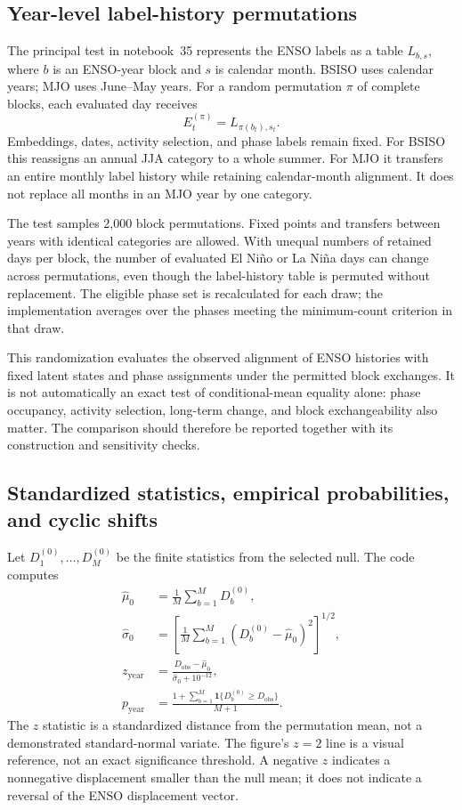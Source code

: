 \documentclass[11pt]{article}
\begin{document}
\subsection{Year-level label-history permutations}

The principal test in notebook~35 represents the ENSO labels as a table $L_{b,s}$, where $b$ is an ENSO-year block and $s$ is calendar month. BSISO uses calendar years; MJO uses June--May years. For a random permutation $\pi$ of complete blocks, each evaluated day receives
\begin{equation}
E_t^{(\pi)}=L_{\pi(b_t),s_t}.
\label{eq:permutation}
\end{equation}
Embeddings, dates, activity selection, and phase labels remain fixed. For BSISO this reassigns an annual JJA category to a whole summer. For MJO it transfers an entire monthly label history while retaining calendar-month alignment. It does not replace all months in an MJO year by one category.

The test samples 2,000 block permutations. Fixed points and transfers between years with identical categories are allowed. With unequal numbers of retained days per block, the number of evaluated El Ni\~no or La Ni\~na days can change across permutations, even though the label-history table is permuted without replacement. The eligible phase set is recalculated for each draw; the implementation averages over the phases meeting the minimum-count criterion in that draw.

This randomization evaluates the observed alignment of ENSO histories with fixed latent states and phase assignments under the permitted block exchanges. It is not automatically an exact test of conditional-mean equality alone: phase occupancy, activity selection, long-term change, and block exchangeability also matter. The comparison should therefore be reported together with its construction and sensitivity checks.

\subsection{Standardized statistics, empirical probabilities, and cyclic shifts}

Let $D_1^{(0)},\ldots,D_M^{(0)}$ be the finite statistics from the selected null. The code computes
\begin{align}
\widehat\mu_0&=\frac{1}{M}\sum_{b=1}^{M}D_b^{(0)},\\
\widehat\sigma_0&=
\left[\frac{1}{M}\sum_{b=1}^{M}(D_b^{(0)}-\widehat\mu_0)^2\right]^{1/2},\\
z_{\mathrm{year}}&=
\frac{D_{\mathrm{obs}}-\widehat\mu_0}{\widehat\sigma_0+10^{-12}},
\label{eq:z}\\
p_{\mathrm{year}}&=
\frac{1+\sum_{b=1}^{M}\mathbf1\{D_b^{(0)}\geq D_{\mathrm{obs}}\}}{M+1}.
\label{eq:p}
\end{align}
The $z$ statistic is a standardized distance from the permutation mean, not a demonstrated standard-normal variate. The figure's $z=2$ line is a visual reference, not an exact significance threshold. A negative $z$ indicates a nonnegative displacement smaller than the null mean; it does not indicate a reversal of the ENSO displacement vector.
\end{document}
